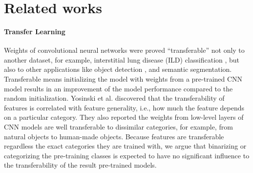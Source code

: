 \section{Related works}
\label{sec:related}

%



\paragraph{Transfer Learning}


Weights of convolutional neural networks were proved ``transferable'' not only to another dataset, for example, interstitial lung disease (ILD) classification \cite{shin2016deep}, but also to other applications like object detection  \cite{girshick2014rich}, and semantic segmentation\cite{long2015fully}.
Transferable means initializing the model with weights from a pre-trained CNN model results in an improvement of the model performance compared to the random initialization. \cite{pan2010survey}
Yosinski et al. \cite{yosinski2014transferable} discovered that the transferability of features is correlated with feature generality, i.e., how much the feature depends on a particular category.
They also reported the weights from low-level layers of CNN models are well transferable to dissimilar categories, for example, from natural objects to human-made objects.
Because features are transferable regardless the exact categories they are trained with, we argue that binarizing or categorizing the pre-training classes is expected to have no significant influence to the transferability of the result pre-trained models.

